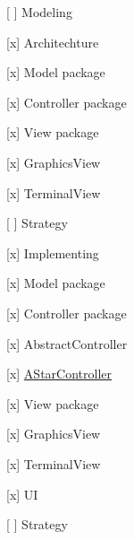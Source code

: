 \begin{DoxyItemize}
\item \mbox{[} \mbox{]} Modeling
\begin{DoxyItemize}
\item \mbox{[}x\mbox{]} Architechture
\item \mbox{[}x\mbox{]} Model package
\item \mbox{[}x\mbox{]} Controller package
\item \mbox{[}x\mbox{]} View package
\begin{DoxyItemize}
\item \mbox{[}x\mbox{]} Graphics\+View
\item \mbox{[}x\mbox{]} Terminal\+View
\end{DoxyItemize}
\item \mbox{[} \mbox{]} Strategy
\end{DoxyItemize}
\item \mbox{[}x\mbox{]} Implementing
\begin{DoxyItemize}
\item \mbox{[}x\mbox{]} Model package
\item \mbox{[}x\mbox{]} Controller package
\begin{DoxyItemize}
\item \mbox{[}x\mbox{]} Abstract\+Controller
\item \mbox{[}x\mbox{]} \hyperlink{classAStarController}{A\+Star\+Controller}
\end{DoxyItemize}
\item \mbox{[}x\mbox{]} View package
\begin{DoxyItemize}
\item \mbox{[}x\mbox{]} Graphics\+View
\item \mbox{[}x\mbox{]} Terminal\+View
\end{DoxyItemize}
\item \mbox{[}x\mbox{]} UI
\item \mbox{[} \mbox{]} Strategy 
\end{DoxyItemize}
\end{DoxyItemize}